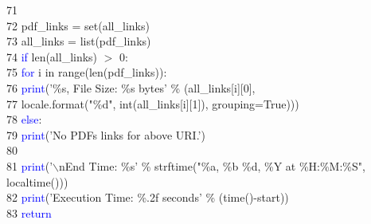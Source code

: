 71	 \hspace*{5mm}\\
72	 \hspace*{5mm}    \hspace*{5mm}pdf\_links = set(all\_links)\\
73	 \hspace*{5mm}    \hspace*{5mm}all\_links = list(pdf\_links)\\
74	 \hspace*{5mm}    \hspace*{5mm}\textcolor{blue}{if} len(all\_links) $>$ 0:\\
75	 \hspace*{5mm}        \hspace*{10mm}\textcolor{blue}{for} i in range(len(pdf\_links)):\\
76	 \hspace*{5mm}            \hspace*{15mm}\textcolor{blue}{print}('\%s, File Size: \%s bytes' \% (all\_links[i][0],\\
77	 \hspace*{5mm}                                              \hspace*{57.5mm}locale.format("\%d", int(all\_links[i][1]), grouping=True)))\\
78	 \hspace*{5mm}    \hspace*{5mm}\textcolor{blue}{else}:\\
79	 \hspace*{5mm}        \hspace*{10mm}\textcolor{blue}{print}('No PDFs links for above URI.')\\
80	 \hspace*{5mm}\\
81	 \hspace*{5mm}    \hspace*{5mm}\textcolor{blue}{print}('$\backslash$nEnd Time:  \hspace*{2.5mm}\%s' \% strftime("\%a,  \hspace*{2.5mm}\%b \%d, \%Y at \%H:\%M:\%S", localtime()))\\
82	 \hspace*{5mm}    \hspace*{5mm}\textcolor{blue}{print}('Execution Time: \%.2f seconds' \% (time()-start))\\
83	 \hspace*{5mm}    \hspace*{5mm}\textcolor{blue}{return}\\
